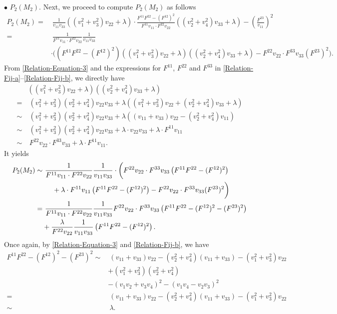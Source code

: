 \documentclass[11pt]{amsart}
\numberwithin{theorem}{section}
\numberwithin{equation}{section}
\begin{document}
$\bullet$ $P_2(M_2)$. Next, we proceed to compute $P_2(M_2)$ as follows
\begin{align*}
P_2(M_2)=&~\frac{1}{v_{11}v_{33}}\left((v_1^2+v_3^2)v_{22}+\lambda\right)\cdot\frac{F^{11}F^{22}-(F^{12})^2}{F^{11}v_{11}\cdot F^{22}v_{22}}\left((v_2^2+v_4^2)v_{33}+\lambda\right)-\left(\frac{F^{23}}{v_{11}}\right)^2\\
=&~\frac{1}{F^{11}v_{11}\cdot F^{22}v_{22}}\frac{1}{v_{11}v_{33}}\\
&\cdot\bigg(\left(F^{11}F^{22}-(F^{12})^2\right)\left((v_1^2+v_3^2)v_{22}+\lambda\right)\left((v_2^2+v_4^2)v_{33}+\lambda\right)-F^{22}v_{22}\cdot F^{33}v_{33}(F^{23})^2\bigg).
\end{align*}
From \eqref{Relation-Equation-3} and the expressions for $F^{11}$, $F^{22}$ and $F^{33}$ in \eqref{Relation-Fij-a}--\eqref{Relation-Fij-b}, we directly have
\begin{align*}
&\left((v_1^2+v_3^2)v_{22}+\lambda\right)\left((v_2^2+v_4^2)v_{33}+\lambda\right)\\
=&~(v_1^2+v_3^2)(v_2^2+v_4^2)v_{22}v_{33}+\lambda\left((v_1^2+v_3^2)v_{22}+(v_2^2+v_4^2)v_{33}+\lambda\right)\\
\sim&~(v_1^2+v_3^2)(v_2^2+v_4^2)v_{22}v_{33}+\lambda\left((v_{11}+v_{33})v_{22}-(v_2^2+v_4^2)v_{11}\right)\\
\sim&~(v_1^2+v_3^2)(v_2^2+v_4^2)v_{22}v_{33}+\lambda\cdot v_{22}v_{33}+\lambda\cdot F^{11}v_{11}\\
\sim&~F^{22}v_{22}\cdot F^{33}v_{33}+\lambda\cdot F^{11}v_{11}.
\end{align*}
It yields
\begin{align*}
P_2(M_2)\sim&~\frac{1}{F^{11}v_{11}\cdot F^{22}v_{22}}\frac{1}{v_{11}v_{33}}\cdot\bigg(F^{22}v_{22}\cdot F^{33}v_{33}\left(F^{11}F^{22}-(F^{12})^2\right)\\
&\hspace{0.5cm}+\lambda\cdot F^{11}v_{11}\left(F^{11}F^{22} -(F^{12})^2\right)-F^{22}v_{22}\cdot F^{33}v_{33}(F^{23})^2\bigg)\\
=&~\frac{1}{F^{11}v_{11}\cdot F^{22}v_{22}}\frac{1}{v_{11}v_{33}}F^{22}v_{22}\cdot F^{33}v_{33}\left(F^{11}F^{22}-(F^{12})^2-(F^{23})^2\right)\\
&+\frac{\lambda}{F^{22}v_{22}}\frac{1}{v_{11}v_{33}}\left(F^{11}F^{22}-(F^{12})^2\right).
\end{align*}
Once again, by \eqref{Relation-Equation-3} and \eqref{Relation-Fij-b}, we have
\begin{equation}\label{Relation-elliptic coefficients-3}
\begin{aligned}
F^{11}F^{22}-(F^{12})^2-(F^{23})^2
\sim&~(v_{11}+v_{33})v_{22}-(v_2^2+v_4^2)(v_{11}+v_{33})-(v_1^2+v_3^2)v_{22}\\
&+(v_1^2+v_3^2)(v_2^2+v_4^2)\\
&-(v_1v_2+v_3v_4)^2-(v_1v_4-v_2v_3)^2\\
=&~(v_{11}+v_{33})v_{22}-(v_2^2+v_4^2)(v_{11}+v_{33})-(v_1^2+v_3^2)v_{22}\\
\sim&~\lambda.
\end{aligned}
\end{equation}
\end{document}
